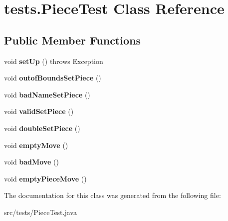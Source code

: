 \hypertarget{classtests_1_1_piece_test}{\section{tests.\-Piece\-Test Class Reference}
\label{classtests_1_1_piece_test}
}
\subsection*{Public Member Functions}
\begin{DoxyCompactItemize}
\item 
\hypertarget{classtests_1_1_piece_test_a1ab49aec08c05c3fc20f2640ec23a9cd}{void {\bfseries set\-Up} ()  throws Exception }\label{classtests_1_1_piece_test_a1ab49aec08c05c3fc20f2640ec23a9cd}

\item 
\hypertarget{classtests_1_1_piece_test_a972a9d2d0bb092b117d0ced56b647b5c}{void {\bfseries outof\-Bounds\-Set\-Piece} ()}\label{classtests_1_1_piece_test_a972a9d2d0bb092b117d0ced56b647b5c}

\item 
\hypertarget{classtests_1_1_piece_test_a33a87cee6944d5a2d70cf8ff95e4d717}{void {\bfseries bad\-Name\-Set\-Piece} ()}\label{classtests_1_1_piece_test_a33a87cee6944d5a2d70cf8ff95e4d717}

\item 
\hypertarget{classtests_1_1_piece_test_a28da89b79e8d8ee7b0245ee5ae0337d3}{void {\bfseries valid\-Set\-Piece} ()}\label{classtests_1_1_piece_test_a28da89b79e8d8ee7b0245ee5ae0337d3}

\item 
\hypertarget{classtests_1_1_piece_test_a4c2edac4d58c1f713e8cc0b4667f5950}{void {\bfseries double\-Set\-Piece} ()}\label{classtests_1_1_piece_test_a4c2edac4d58c1f713e8cc0b4667f5950}

\item 
\hypertarget{classtests_1_1_piece_test_aecd0ae7920e3db30e4e89dc8459ffeba}{void {\bfseries empty\-Move} ()}\label{classtests_1_1_piece_test_aecd0ae7920e3db30e4e89dc8459ffeba}

\item 
\hypertarget{classtests_1_1_piece_test_acc83a7d60ca8013ac8c4830daaa71816}{void {\bfseries bad\-Move} ()}\label{classtests_1_1_piece_test_acc83a7d60ca8013ac8c4830daaa71816}

\item 
\hypertarget{classtests_1_1_piece_test_a861c221cfe010242746505ec1941b130}{void {\bfseries empty\-Piece\-Move} ()}\label{classtests_1_1_piece_test_a861c221cfe010242746505ec1941b130}

\end{DoxyCompactItemize}


The documentation for this class was generated from the following file\-:\begin{DoxyCompactItemize}
\item 
src/tests/Piece\-Test.\-java\end{DoxyCompactItemize}
